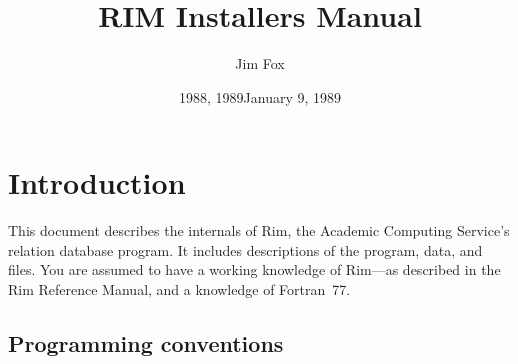 \documentclass[11pt,a4paper]{report}
\begin{document}
%
\author{Jim Fox}
\date  {1988, 1989}
\title {RIM Installers Manual}
\date   {January 9, 1989}

\def\UCScopytext{%
  Permission is granted to make and distribute verbatim copies of
  this manual provided the copyright notice and this permission notice
  are preserved on all copies.
  \par
  Permission is granted to copy and distribute modified versions of this
  manual under the conditions for verbatim copying, provided also that the
  sections entitled ``Distribution'' and
  ``Rim General Public License'' are included exactly as in the original, and
  provided that the entire resulting derived work is distributed under the
  terms of a permission notice identical to this one.
  \par
  \par}
\maketitle
%
\tableofcontents
\listoftables


%
%
%

%
%
%
\chapter{Introduction}
 
This document describes the internals of Rim,
the Academic Computing Service's relation database program.
It includes descriptions of the program, data, and files.
You are assumed to have a working knowledge of Rim---as
described in the Rim Reference Manual, and a knowledge
of Fortran~77.
 
\section{Programming conventions}
 
\end{document}
